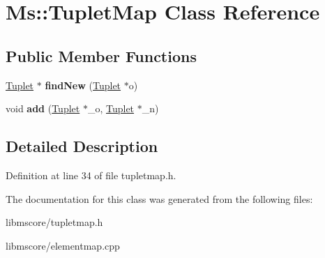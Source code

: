 \hypertarget{class_ms_1_1_tuplet_map}{}\section{Ms\+:\+:Tuplet\+Map Class Reference}
\label{class_ms_1_1_tuplet_map}
\subsection*{Public Member Functions}
\begin{DoxyCompactItemize}
\item 
\mbox{\label{class_ms_1_1_tuplet_map_a50442ffbf2dff275879ccc7781e32d79}} 
\hyperlink{class_ms_1_1_tuplet}{Tuplet} $\ast$ {\bfseries find\+New} (\hyperlink{class_ms_1_1_tuplet}{Tuplet} $\ast$o)
\item 
\mbox{\label{class_ms_1_1_tuplet_map_a585d9e9c7a8ff6ad822e00cdfe9e52fe}} 
void {\bfseries add} (\hyperlink{class_ms_1_1_tuplet}{Tuplet} $\ast$\+\_\+o, \hyperlink{class_ms_1_1_tuplet}{Tuplet} $\ast$\+\_\+n)
\end{DoxyCompactItemize}


\subsection{Detailed Description}


Definition at line 34 of file tupletmap.\+h.



The documentation for this class was generated from the following files\+:\begin{DoxyCompactItemize}
\item 
libmscore/tupletmap.\+h\item 
libmscore/elementmap.\+cpp\end{DoxyCompactItemize}
